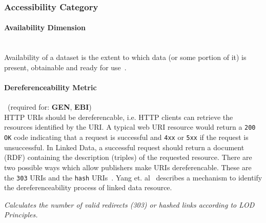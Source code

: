 
\subsubsection{Accessibility Category}
\label{sec:Accessibility} 

\paragraph{Availability Dimension}~\\%
Availability of a dataset is the extent to which data (or some portion of it) is present, obtainable and ready for use~\cite{Zaveri2012:LODQ}.

\paragraph{Dereferenceability Metric}~(required for: \textbf{GEN}, \textbf{EBI})~\\ %
HTTP URIs should be dereferencable, i.e. HTTP clients can retrieve the resources identified by the URI.
A typical web URI resource would return a \texttt{200 OK} code indicating that a request is successful and \texttt{4xx} or \texttt{5xx} if the request is unsuccessful. 
In Linked Data, a successful request should return a document (RDF) containing the description (triples) of the requested resource.
There are two possible ways which allow publishers make URIs dereferencable.
These are the \texttt{303} URIs and the \texttt{hash} URIs~\cite{W3C:CoolURIs}.
Yang et. al~\cite{Yang2011} describes a mechanism to identify the dereferenceability process of linked data resource.
\begin{mdframed}[style=metricdefinition]
\emph{Calculates the number of valid redirects (303) or hashed links according to LOD Principles.}
\end{mdframed}

